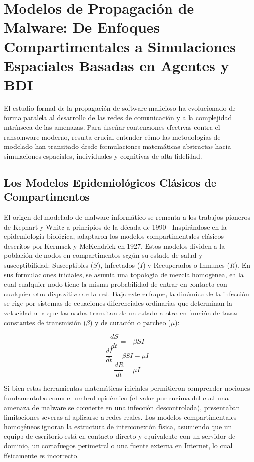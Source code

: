 \section{Modelos de Propagación de Malware: De Enfoques Compartimentales a Simulaciones Espaciales Basadas en Agentes y BDI}
\label{sec:estado_arte}
El estudio formal de la propagación de software malicioso ha evolucionado de forma paralela al desarrollo de las redes de comunicación y a la complejidad intrínseca de las amenazas. Para diseñar contenciones efectivas contra el ransomware moderno, resulta crucial entender cómo las metodologías de modelado han transitado desde formulaciones matemáticas abstractas hacia simulaciones espaciales, individuales y cognitivas de alta fidelidad.

\subsection{Los Modelos Epidemiológicos Clásicos de Compartimentos}
El origen del modelado de malware informático se remonta a los trabajos pioneros de Kephart y White a principios de la década de 1990 \cite{kephart1991directed, kephart1993measuring}. Inspirándose en la epidemiología biológica, adaptaron los modelos compartimentales clásicos descritos por Kermack y McKendrick en 1927. Estos modelos dividen a la población de nodos en compartimentos según su estado de salud y susceptibilidad: Susceptibles ($S$), Infectados ($I$) y Recuperados o Inmunes ($R$).
En sus formulaciones iniciales, se asumía una topología de mezcla homogénea, en la cual cualquier nodo tiene la misma probabilidad de entrar en contacto con cualquier otro dispositivo de la red. Bajo este enfoque, la dinámica de la infección se rige por sistemas de ecuaciones diferenciales ordinarias que determinan la velocidad a la que los nodos transitan de un estado a otro en función de tasas constantes de transmisión ($\beta$) y de curación o parcheo ($\mu$):

$$\frac{dS}{dt} = -\beta S I$$
$$\frac{dI}{dt} = \beta S I - \mu I$$
$$\frac{dR}{dt} = \mu I$$

Si bien estas herramientas matemáticas iniciales permitieron comprender nociones fundamentales como el umbral epidémico (el valor por encima del cual una amenaza de malware se convierte en una infección descontrolada), presentaban limitaciones severas al aplicarse a redes reales. Los modelos compartimentales homogéneos ignoran la estructura de interconexión física, asumiendo que un equipo de escritorio está en contacto directo y equivalente con un servidor de dominio, un cortafuegos perimetral o una fuente externa en Internet, lo cual físicamente es incorrecto.

